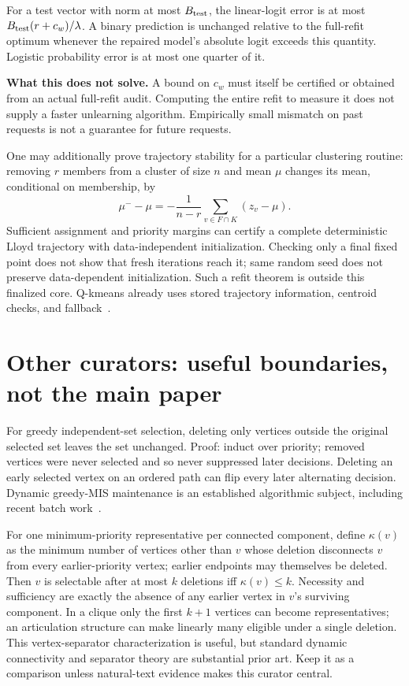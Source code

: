 \documentclass[11pt,a4paper]{article}
\theoremstyle{definition}\newtheorem{definition}[theorem]{Definition}
\begin{document}
For a test vector with norm at most $B_{\rm test}$, the linear-logit error is at most $B_{\rm test}(r+c_w)/\lambda$. A binary prediction is unchanged relative to the full-refit optimum whenever the repaired model's absolute logit exceeds this quantity. Logistic probability error is at most one quarter of it.

\textbf{What this does not solve.} A bound on $c_w$ must itself be certified or obtained from an actual full-refit audit. Computing the entire refit to measure it does not supply a faster unlearning algorithm. Empirically small mismatch on past requests is not a guarantee for future requests.

One may additionally prove trajectory stability for a particular clustering routine: removing $r$ members from a cluster of size $n$ and mean $\mu$ changes its mean, conditional on membership, by
\[
 \mu^- -\mu=-\frac{1}{n-r}\sum_{v\in F\cap K}(z_v-\mu).
\]
Sufficient assignment and priority margins can certify a complete deterministic Lloyd trajectory with data-independent initialization. Checking only a final fixed point does not show that fresh iterations reach it; same random seed does not preserve data-dependent initialization. Such a refit theorem is outside this finalized core. Q-kmeans already uses stored trajectory information, centroid checks, and fallback~\cite{ginart2019}.

\section{Other curators: useful boundaries, not the main paper}
For greedy independent-set selection, deleting only vertices outside the original selected set leaves the set unchanged. Proof: induct over priority; removed vertices were never selected and so never suppressed later decisions. Deleting an early selected vertex on an ordered path can flip every later alternating decision. Dynamic greedy-MIS maintenance is an established algorithmic subject, including recent batch work~\cite{assadi2019,dhulipala2026}.

For one minimum-priority representative per connected component, define $\kappa(v)$ as the minimum number of vertices other than $v$ whose deletion disconnects $v$ from every earlier-priority vertex; earlier endpoints may themselves be deleted. Then $v$ is selectable after at most $k$ deletions iff $\kappa(v)\le k$. Necessity and sufficiency are exactly the absence of any earlier vertex in $v$'s surviving component. In a clique only the first $k+1$ vertices can become representatives; an articulation structure can make linearly many eligible under a single deletion. This vertex-separator characterization is useful, but standard dynamic connectivity and separator theory are substantial prior art. Keep it as a comparison unless natural-text evidence makes this curator central.
\end{document}

